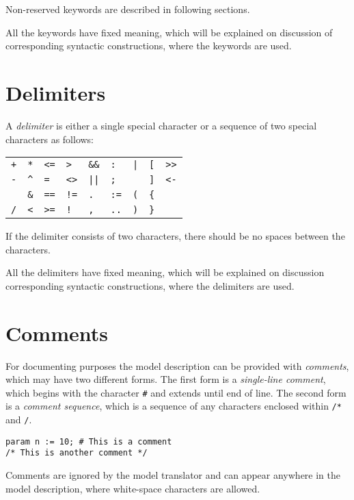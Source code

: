\documentclass[11pt]{report}
\def\para#1{\noindent{\bf#1}}
\begin{document}
Non-reserved keywords are described in following sections.

All the keywords have fixed meaning, which will be explained on
discussion of corresponding syntactic constructions, where the keywords
are used.

\section{Delimiters}

A {\it delimiter} is either a single special character or a sequence of
two special characters as follows:

\noindent\hfil
\begin{tabular}{@{}p{.3in}p{.3in}p{.3in}p{.3in}p{.3in}p{.3in}p{.3in}
p{.3in}p{.3in}@{}}
{\tt+}&{\tt**}&{\tt<=}&{\tt>}&{\tt\&\&}&{\tt:}&{\tt|}&{\tt[}&
{\tt>>}\\
{\tt-}&{\tt\textasciicircum}&{\tt=}&{\tt<>}&{\tt||}&{\tt;}&
{\tt\char126}&{\tt]}&{\tt<-}\\
{\tt*}&{\tt\&}&{\tt==}&{\tt!=}&{\tt.}&{\tt:=}&{\tt(}&{\tt\{}\\
{\tt/}&{\tt<}&{\tt>=}&{\tt!}&{\tt,}&{\tt..}&{\tt)}&{\tt\}}\\
\end{tabular}

If the delimiter consists of two characters, there should be no spaces
between the characters.

All the delimiters have fixed meaning, which will be explained on
discussion corresponding syntactic constructions, where the delimiters
are used.

\section{Comments}

For documenting purposes the model description can be provided with
{\it comments}, which may have two different forms. The first form is
a {\it single-line comment}, which begins with the character {\tt\#}
and extends until end of line. The second form is a {\it comment
sequence}, which is a sequence of any characters enclosed within
{\tt/*} and {\tt*/}.

\para{Examples}

\begin{verbatim}
param n := 10; # This is a comment
/* This is another comment */
\end{verbatim}

Comments are ignored by the model translator and can appear anywhere in
the model description, where white-space characters are allowed.
\end{document}
